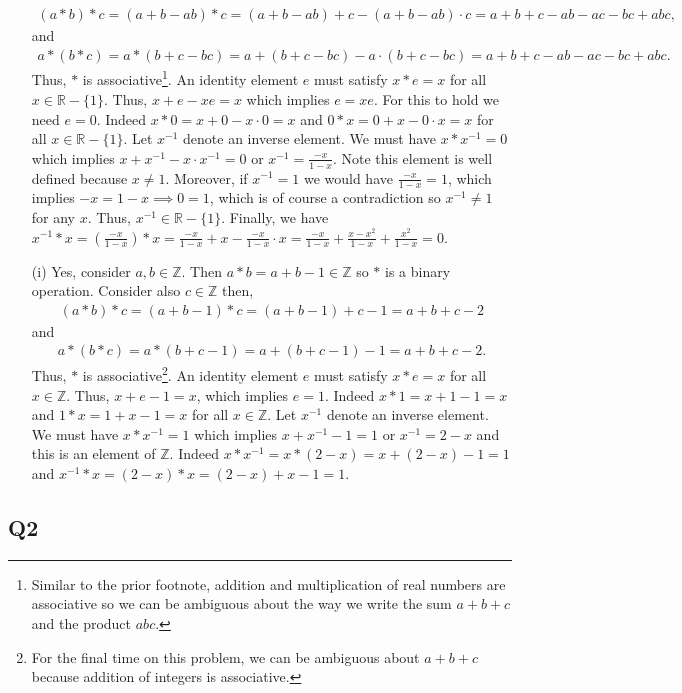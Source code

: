 \documentclass[12pt]{article}
\def\Z{{\mathbb Z}}        %
\def\R{{\mathbb R}}        %
\numberwithin{theorem}{section}
\numberwithin{equation}{section}
\numberwithin{remark}{section}
\numberwithin{definition}{section}
\numberwithin{theorem}{section}
\numberwithin{lemma}{section}
\numberwithin{example}{section}
\begin{document}
\begin{itemize}
{		\begin{align*}
			(a*b)*c=(a+b-ab)*c=(a+b-ab) + c - (a+b-ab)\cdot c = a + b + c - ab -ac - bc + abc,
		\end{align*}
	and
		\begin{align*}
			a*(b*c)=a*(b+c-bc)=a + (b+c-bc) - a\cdot (b+c-bc) = a + b + c - ab - ac - bc + abc.
		\end{align*}
	Thus, $*$ is associative\footnote{Similar to the prior footnote, addition and multiplication of real numbers are associative so we can be ambiguous about the way we write the sum $a+b+c$ and the product $abc$.}. An identity element $e$ must satisfy $x*e=x$ for all $x\in\R-\{1\}$. Thus, $x+e-xe=x$ which implies $e=xe$. For this to hold we need $e=0$. Indeed $x*0=x+0-x\cdot0=x$ and $0*x=0+x-0\cdot x=x$ for all $x\in\R-\{1\}$. Let $x^{-1}$ denote an inverse element. We must have $x*x^{-1}=0$ which implies $x+x^{-1}-x\cdot x^{-1}=0$ or $x^{-1}=\frac{-x}{1-x}$. Note this element is well defined because $x\neq1$. Moreover, if $x^{-1}=1$ we would have $\frac{-x}{1-x}=1$, which implies $-x=1-x\implies0=1$, which is of course a contradiction so $x^{-1}\neq1$ for any $x$. Thus, $x^{-1}\in\R-\{1\}$. Finally, we have $x^{-1}*x=\left(\frac{-x}{1-x}\right)*x=\frac{-x}{1-x}+x-\frac{-x}{1-x}\cdot x=\frac{-x}{1-x}+\frac{x-x^2}{1-x}+\frac{x^2}{1-x}=0$.}
	\item[(i)]{Yes, consider $a,b\in\Z$. Then $a*b=a+b-1\in\Z$ so $*$ is a binary operation. Consider also $c\in\Z$ then,
		\begin{align*}
			(a*b)*c=(a+b-1)*c=(a+b-1)+c-1=a+b+c-2
		\end{align*}
	and
		\begin{align*}
			a*(b*c)=a*(b+c-1)=a+(b+c-1)-1=a+b+c-2.
		\end{align*}
	Thus, $*$ is associative\footnote{For the final time on this problem, we can be ambiguous about $a+b+c$ because addition of integers is associative.}. An identity element $e$ must satisfy $x*e=x$ for all $x\in\Z$. Thus, $x+e-1=x$, which implies $e=1$. Indeed $x*1=x+1-1=x$ and $1*x=1+x-1=x$ for all $x\in\Z$. Let $x^{-1}$ denote an inverse element. We must have $x*x^{-1}=1$ which implies $x+x^{-1}-1=1$ or $x^{-1}=2-x$ and this is an element of $\Z$. Indeed $x*x^{-1}=x*(2-x)=x+(2-x)-1=1$ and $x^{-1}*x=(2-x)*x=(2-x)+x-1=1$.}
\end{itemize}

\subsection{Q2}
\end{document}
